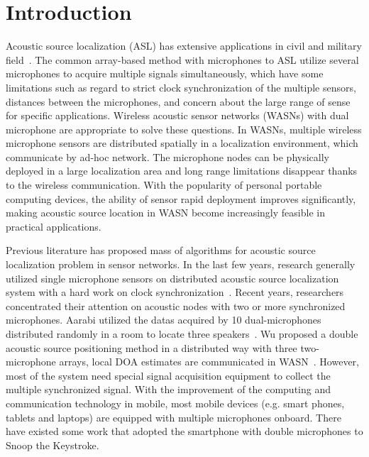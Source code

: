 \section{Introduction}

Acoustic source localization (ASL) has extensive applications in civil and military field~\cite{Meesookho2008,sallai2011acoustic,Liu2017Multiple}. The common array-based
method with microphones to ASL utilize several microphones
to acquire multiple signals simultaneously, which have some
limitations such as regard to strict clock synchronization of the multiple sensors, distances between the microphones,
and concern about the large range of sense for specific applications.  Wireless acoustic sensor networks
(WASNs)  with dual microphone are appropriate to solve these questions. In WASNs, multiple wireless microphone sensors are distributed spatially 
in a localization environment, which communicate by ad-hoc network. The microphone nodes can be physically deployed in a large localization area and long range limitations disappear thanks to the wireless communication. With the popularity of personal portable
computing devices, the ability of sensor rapid deployment improves significantly, making acoustic source location in WASN become increasingly feasible in practical applications.

Previous literature has proposed mass of algorithms for acoustic source localization problem in sensor networks. In the last few years, research generally utilized single microphone sensors on distributed acoustic source localization system  with a hard work on clock synchronization~\cite{Canclini2013}. Recent years, researchers concentrated their attention on acoustic
nodes with two or more synchronized microphones.
Aarabi utilized the datas acquired by 10 dual-microphones distributed randomly in a room to locate three speakers~\cite{aarabi1900fusion}. Wu proposed a double acoustic source positioning method
in a distributed way with three two-microphone arrays, local DOA estimates are communicated in WASN~\cite{wu2012fusion}. However, most of the system need special signal acquisition equipment to collect the multiple synchronized signal. With the improvement of the computing and communication technology in mobile, most mobile devices (e.g. smart phones,
tablets and laptops) are equipped with multiple microphones
onboard. There have existed some work that adopted the smartphone with double microphones to Snoop the Keystroke\cite{zhu2014context,Liusnooping}. 



